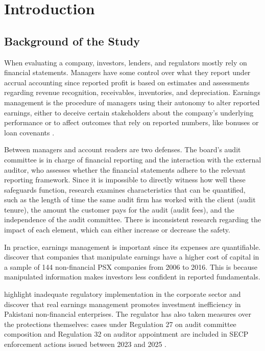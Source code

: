 \chapter{Introduction}

\section{Background of the Study}

When evaluating a company, investors, lenders, and regulators mostly rely on financial statements. Managers have some control over what they report under accrual accounting since reported profit is based on estimates and assessments regarding revenue recognition, receivables, inventories, and depreciation. Earnings management is the procedure of managers using their autonomy to alter reported earnings, either to deceive certain stakeholders about the company's underlying performance or to affect outcomes that rely on reported numbers, like bonuses or loan covenants \parencite{healy1999}.

Between managers and account readers are two defenses. The board's audit committee is in charge of financial reporting and the interaction with the external auditor, who assesses whether the financial statements adhere to the relevant reporting framework. Since it is impossible to directly witness how well these safeguards function, research examines characteristics that can be quantified, such as the length of time the same audit firm has worked with the client (audit tenure), the amount the customer pays for the audit (audit fees), and the independence of the audit committee. There is inconsistent research regarding the impact of each element, which can either increase or decrease the safety.

In practice, earnings management is important since its expenses are quantifiable. \textcite{ilyas2019} discover that companies that manipulate earnings have a higher cost of capital in a sample of 144 non-financial PSX companies from 2006 to 2016. This is because manipulated information makes investors less confident in reported fundamentals.

\textcite{bhutta2022} highlight inadequate regulatory implementation in the corporate sector and discover that real earnings management promotes investment inefficiency in Pakistani non-financial enterprises. The regulator has also taken measures over the protections themselves: cases under Regulation 27 on audit committee composition and Regulation 32 on auditor appointment are included in SECP enforcement actions issued between 2023 and 2025 \parencite{secp2023}.

